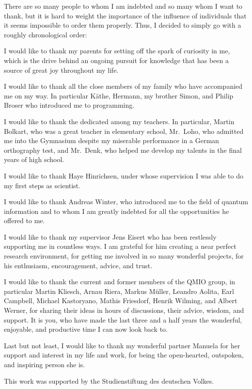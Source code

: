 \documentclass[a4paper,12pt,listof=totoc,index=totoc,bibliography=totoc,headsepline=false,headings=normal,BCOR16.153846mm,DIV12,headinclude,twoside,cleardoublepage=empty,numbers=noenddot,final]{scrreprt}
\theoremstyle{mystyle}
\numberwithin{equation}{section}
\numberwithin{figure}{section}
\numberwithin{lemma}{section}
\numberwithin{theorem}{section}
\numberwithin{corollary}{section}
\numberwithin{definition}{section}
\numberwithin{conjecture}{section}
\numberwithin{observation}{section}
\newcommand{\+}{\mkern2mu}
\DeclareMathOperator{\1}{\mathds{1}}
\begin{document}
There are so many people to whom I am indebted and so many whom I want to thank, but it is hard to weight the importance of the influence of individuals that it seems impossible to order them properly.
Thus, I decided to simply go with a roughly chronological order:

I would like to thank my parents for setting off the spark of curiosity in me, which is the drive behind an ongoing pursuit for knowledge that has been a source of great joy throughout my life.

I would like to thank all the close members of my family who have accompanied me on my way.
In particular Käthe, Hermann, my brother Simon, and Philip Broser who introduced me to programming.

I would like to thank the dedicated among my teachers. In particular, Martin Bolkart, who was a great teacher in elementary school, Mr.\ Loho, who admitted me into the Gymnasium despite my miserable performance in a German orthography test, and Mr.\ Denk, who helped me develop my talents in the final years of high school.

I would like to thank Haye Hinrichsen, under whose supervision I was able to do my first steps as scientist.

I would like to thank Andreas Winter, who introduced me to the field of quantum information and to whom I am greatly indebted for all the opportunities he offered to me.

I would like to thank my supervisor Jens Eisert who has been restlessly supporting me in countless ways.
I am grateful for him creating a near perfect research environment, for getting me involved in so many wonderful projects, for his enthusiasm, encouragement, advice, and trust.

I would like to thank the current and former members of the QMIO group, in particular Martin Kliesch, Arnau Riera, Markus Müller, Leandro Aolita, Earl Campbell, Michael Kastoryano, Mathis Friesdorf, Henrik Wilming, and Albert Werner, for sharing their ideas in hours of discussions, their advice, wisdom, and support.
It is you, who have made the last three and a half years the wonderful, enjoyable, and productive time I can now look back to.

Last but not least, I would like to thank my wonderful partner Manuela for her support and interest in my life and work, for being the open-hearted, outspoken, and inspiring person she is.

This work was supported by the Studienstiftung des deutschen Volkes.
\end{document}
